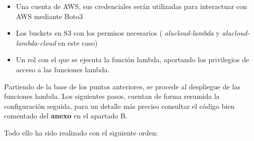 \documentclass[
]{article}
\begin{document}
\begin{itemize}
\item
  Una cuenta de AWS, sus credenciales serán utilizadas para interactuar
  con AWS mediante Boto3
\item
  Los buckets en S3 con los permisos necesarios ( \emph{alucloud-lambda}
  y \emph{alucloud-lambda-cloud} en este caso)
\item
  Un rol con el que se ejecuta la función lambda, aportando los
  privilegios de acceso a las funciones lambda.
\end{itemize}

Partiendo de la base de los puntos anteriores, se procede al despliegue
de las funciones lambda. Los siguientes pasos, cuentan de forma resumida
la configuración seguida, para un detalle más preciso consultar el
código bien comentado del \textbf{anexo} en el apartado B.

Todo ello ha sido realizado con el siguiente orden:
\end{document}
